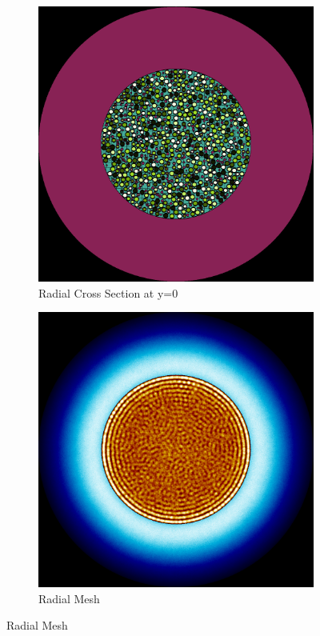 \begin{figure}[H]
\centering

\begin{subfigure}{0.45\textwidth}
  \includegraphics[width=0.95\linewidth]{figures/4560123/4560123-r}
  \caption{Radial Cross Section at y=0}
  \label{fig:4560123-r}
\end{subfigure}%
%
\begin{subfigure}{0.45\textwidth}
  \includegraphics[width=0.95\linewidth]{figures/4560123/4560123-rm}
  \caption{Radial Mesh}
  \label{fig:4560123-rm}
\end{subfigure}


\end{figure}
